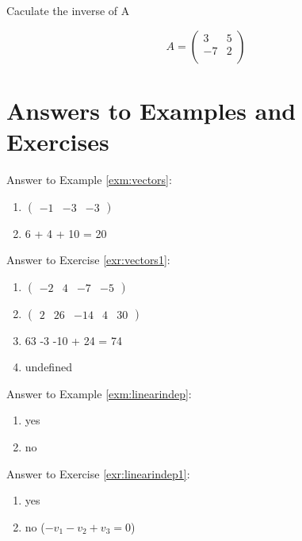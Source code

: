\documentclass[]{book}
\providecommand{\tightlist}{%
  \setlength{\itemsep}{0pt}\setlength{\parskip}{0pt}}
\theoremstyle{definition}
\theoremstyle{definition}
\theoremstyle{definition}
\theoremstyle{remark}
\begin{document}
Caculate the inverse of A

\[A = \begin{pmatrix}
            3 & 5\\
            -7 & 2\\
        \end{pmatrix}\]

\hypertarget{answers-to-examples-and-exercises-1}{%
\section*{Answers to Examples and Exercises}\label{answers-to-examples-and-exercises-1}}

Answer to Example \ref{exm:vectors}:

\begin{enumerate}
\def\labelenumi{\arabic{enumi}.}
\tightlist
\item
  \(\begin{pmatrix} -1 &-3&-3 \end{pmatrix}\)
\item
  6 + 4 + 10 = 20
\end{enumerate}

Answer to Exercise \ref{exr:vectors1}:

\begin{enumerate}
\def\labelenumi{\arabic{enumi}.}
\tightlist
\item
  \(\begin{pmatrix} -2 &4&-7&-5 \end{pmatrix}\)
\item
  \(\begin{pmatrix} 2 &26&-14&4&30 \end{pmatrix}\)
\item
  63 -3 -10 + 24 = 74
\item
  undefined
\end{enumerate}

Answer to Example \ref{exm:linearindep}:

\begin{enumerate}
\def\labelenumi{\arabic{enumi}.}
\tightlist
\item
  yes
\item
  no
\end{enumerate}

Answer to Exercise \ref{exr:linearindep1}:

\begin{enumerate}
\def\labelenumi{\arabic{enumi}.}
\tightlist
\item
  yes
\item
  no (\(-v_1 -v_2 + v_3 = 0\))
\end{enumerate}
\end{document}
